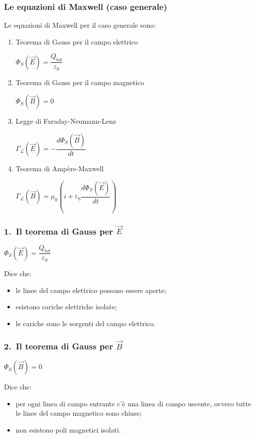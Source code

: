 \documentclass[]{beamer}
\theoremstyle{plain}
\begin{document}
\begin{frame}
\frametitle{Le equazioni di Maxwell (caso generale)}
  Le \alert{equazioni di Maxwell} per il caso generale sono:\begin{enumerate}
  \item Teorema di Gauss per il campo elettrico
  \begin{center}
  \colorbox{marroncino!30}{$ \Phi_S (\vec{E}) = \dfrac{Q_{tot}}{\varepsilon_0} $}
  \end{center}\pause
  \item Teorema di Gauss per il campo magnetico
  \begin{center}
  \colorbox{marroncino!30}{$ \Phi_S (\vec{B}) = 0 $}
  \end{center}\pause
  \item Legge di Faraday-Neumann-Lenz
  \begin{center}
\colorbox{marroncino!30}{  $ \Gamma_\mathscr{L} (\vec{E}) = -\dfrac{d\Phi_S(\vec{B})}{dt} $}
  \end{center}\pause
  \item Teorema di Ampère-Maxwell
  \begin{center}
  \colorbox{marroncino!30}{$ \Gamma_\mathscr{L} (\vec{B}) = \mu_0 \left( i + \varepsilon_0 \dfrac{d\Phi_S(\vec{E})}{dt} \right) $}
  \end{center}
\end{enumerate}
\end{frame}



\begin{frame}
  \frametitle{1.~Il teorema di Gauss per $ \vec{E} $}
    \begin{center}
  \colorbox{marroncino!30}{$ \Phi_S (\vec{E}) = \dfrac{Q_{tot}}{\varepsilon_0} $}
  \end{center}\pause
  Dice che:
  \begin{itemize}
    \item le linee del campo elettrico possono essere aperte;\pause
    \item esistono cariche elettriche isolate;\pause
    \item le cariche sono le sorgenti del campo elettrico.
  \end{itemize}
\end{frame}

\begin{frame}
  \frametitle{2.~Il teorema di Gauss per $ \vec{B} $}
    \begin{center}
  \colorbox{marroncino!30}{$ \Phi_S (\vec{B}) = 0 $}
  \end{center}\pause
  Dice che:
  \begin{itemize}
    \item per ogni linea di campo entrante c'è una linea di campo uscente, ovvero tutte le linee del campo magnetico sono chiuse;\pause
    \item non esistono poli magnetici isolati.
  \end{itemize}
\end{frame}
\end{document}
